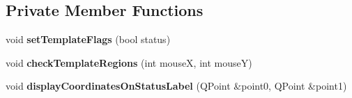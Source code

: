 \subsection*{Private Member Functions}
\begin{CompactItemize}
\item 
\hypertarget{classImgLabel_8a433cfccabf949ad3e975af3f09c120}{
void \textbf{setTemplateFlags} (bool status)}
\label{classImgLabel_8a433cfccabf949ad3e975af3f09c120}

\item 
\hypertarget{classImgLabel_a71c0202c48be349b4fb0813891df43a}{
void \textbf{checkTemplateRegions} (int mouseX, int mouseY)}
\label{classImgLabel_a71c0202c48be349b4fb0813891df43a}

\item 
\hypertarget{classImgLabel_f8fb1abf00b305d1ba4d8b4745b59692}{
void \textbf{displayCoordinatesOnStatusLabel} (QPoint \&point0, QPoint \&point1)}
\label{classImgLabel_f8fb1abf00b305d1ba4d8b4745b59692}

\end{CompactItemize}
